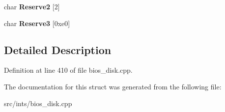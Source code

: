 \begin{DoxyCompactItemize}
\item 
\hypertarget{structNHD__FILE__HEAD_a52453e263173df250e050ed0d5934601}{char {\bfseries Reserve2} \mbox{[}2\mbox{]}}\label{structNHD__FILE__HEAD_a52453e263173df250e050ed0d5934601}

\item 
\hypertarget{structNHD__FILE__HEAD_a18b155dc7152421bb887c3ccc51b9a41}{char {\bfseries Reserve3} \mbox{[}0xe0\mbox{]}}\label{structNHD__FILE__HEAD_a18b155dc7152421bb887c3ccc51b9a41}

\end{DoxyCompactItemize}


\subsection{Detailed Description}


Definition at line 410 of file bios\-\_\-disk.\-cpp.



The documentation for this struct was generated from the following file\-:\begin{DoxyCompactItemize}
\item 
src/ints/bios\-\_\-disk.\-cpp\end{DoxyCompactItemize}
